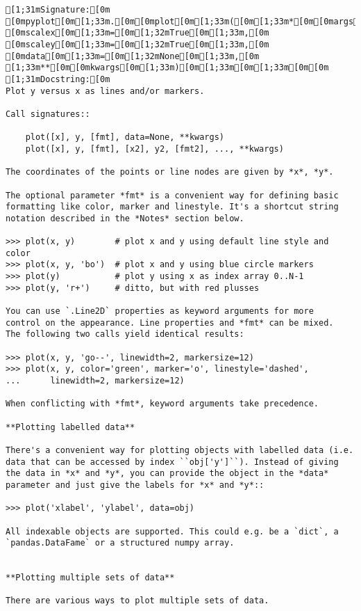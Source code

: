 \documentclass[11pt]{article}
\begin{document}
    
    \begin{verbatim}
[1;31mSignature:[0m [0mpyplot[0m[1;33m.[0m[0mplot[0m[1;33m([0m[1;33m*[0m[0margs[0m[1;33m,[0m [0mscalex[0m[1;33m=[0m[1;32mTrue[0m[1;33m,[0m [0mscaley[0m[1;33m=[0m[1;32mTrue[0m[1;33m,[0m [0mdata[0m[1;33m=[0m[1;32mNone[0m[1;33m,[0m [1;33m**[0m[0mkwargs[0m[1;33m)[0m[1;33m[0m[1;33m[0m[0m
[1;31mDocstring:[0m
Plot y versus x as lines and/or markers.

Call signatures::

    plot([x], y, [fmt], data=None, **kwargs)
    plot([x], y, [fmt], [x2], y2, [fmt2], ..., **kwargs)

The coordinates of the points or line nodes are given by *x*, *y*.

The optional parameter *fmt* is a convenient way for defining basic
formatting like color, marker and linestyle. It's a shortcut string
notation described in the *Notes* section below.

>>> plot(x, y)        # plot x and y using default line style and color
>>> plot(x, y, 'bo')  # plot x and y using blue circle markers
>>> plot(y)           # plot y using x as index array 0..N-1
>>> plot(y, 'r+')     # ditto, but with red plusses

You can use `.Line2D` properties as keyword arguments for more
control on the appearance. Line properties and *fmt* can be mixed.
The following two calls yield identical results:

>>> plot(x, y, 'go--', linewidth=2, markersize=12)
>>> plot(x, y, color='green', marker='o', linestyle='dashed',
...      linewidth=2, markersize=12)

When conflicting with *fmt*, keyword arguments take precedence.

**Plotting labelled data**

There's a convenient way for plotting objects with labelled data (i.e.
data that can be accessed by index ``obj['y']``). Instead of giving
the data in *x* and *y*, you can provide the object in the *data*
parameter and just give the labels for *x* and *y*::

>>> plot('xlabel', 'ylabel', data=obj)

All indexable objects are supported. This could e.g. be a `dict`, a
`pandas.DataFame` or a structured numpy array.


**Plotting multiple sets of data**

There are various ways to plot multiple sets of data.


\end{verbatim}
\end{document}
